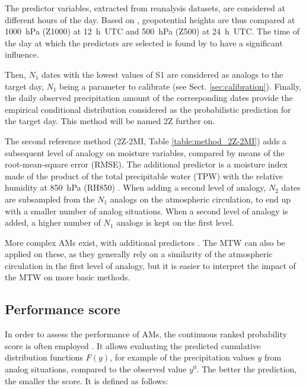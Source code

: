 \documentclass[hess, manuscript]{copernicus}
\begin{document}
The predictor variables, extracted from reanalysis datasets, are considered at different hours of the day. Based on \citet{Bontron2005}, geopotential heights are thus compared at 1000~hPa (Z1000) at 12~h~UTC and 500~hPa (Z500) at 24~h~UTC. The time of the day at which the predictors are selected is found by \citet{Bontron2004} to have a significant influence.

Then, $N_{1}$ dates with the lowest values of S1 are considered as analogs to the target day, $N_{1}$ being a parameter to calibrate (see Sect. \ref{sec:calibration}). Finally, the daily observed precipitation amount of the corresponding dates provide the empirical conditional distribution considered as the probabilistic prediction for the target day. This method will be named 2Z further on.

The second reference method (2Z-2MI, Table \ref{table:method_2Z-2MI}) adds a subsequent level of analogy on moisture variables, compared by means of the root-mean-square error (RMSE). The additional predictor is a moisture index made of the product of the total precipitable water (TPW) with the relative humidity at 850~hPa (RH850) \citep{Bontron2004}. When adding a second level of analogy, $N_{2}$ dates are subsampled from the $N_{1}$ analogs on the atmospheric circulation, to end up with a smaller number of analog situations. When a second level of analogy is added, a higher number of $N_{1}$ analogs is kept on the first level.

More complex AMs exist, with additional predictors \citep[see e.g.][]{Horton2012a, BenDaoud2016, Caillouet2016}. The MTW can also be applied on these, as they generally rely on a similarity of the atmospheric circulation in the first level of analogy, but it is easier to interpret the impact of the MTW on more basic methods.


\subsection{Performance score}
\label{sec:performance}

In order to assess the performance of AMs, the continuous ranked probability score \citep[CRPS,][]{Brown1974, Matheson1976, Hersbach2000} is often employed \citep[see, e.g.,][]{Bontron2004, Bontron2005, BenDaoud2008, Horton2012, Marty2012, Radanovics2013, Chardon2014, Junk2015, BenDaoud2016, Caillouet2016}. It allows evaluating the predicted cumulative distribution functions $F(y)$, for example of the precipitation values $y$ from analog situations, compared to the observed value $y^{0}$. The better the prediction, the smaller the score. It is defined as follows:
\end{document}
